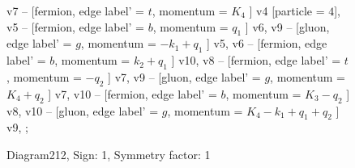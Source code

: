 \documentclass{revtex4}
\begin{document}
\begin{figure}[!htb]
\begin{center}
{v7 -- [fermion, edge label' = \(t\), momentum = \(K_{4}\) ] v4 [particle = \(4\)], 
v5 -- [fermion, edge label' = \(b\), momentum = \(q_{1}\) ] v6, 
v9 -- [gluon, edge label' = \(g\), momentum = \(-k_{1} + q_{1}\) ] v5, 
v6 -- [fermion, edge label' = \(b\), momentum = \(k_{2} + q_{1}\) ] v10, 
v8 -- [fermion, edge label' = \(t\), momentum = \(-q_{2}\) ] v7, 
v9 -- [gluon, edge label' = \(g\), momentum = \(K_{4} + q_{2}\) ] v7, 
v10 -- [fermion, edge label' = \(b\), momentum = \(K_{3} - q_{2}\) ] v8, 
v10 -- [gluon, edge label' = \(g\), momentum = \(K_{4} - k_{1} + q_{1} + q_{2}\) ] v9, 
};
\end{center}
\caption{Diagram212, Sign: 1, Symmetry factor: 1}
\end{figure}
\newpage
\end{document}
